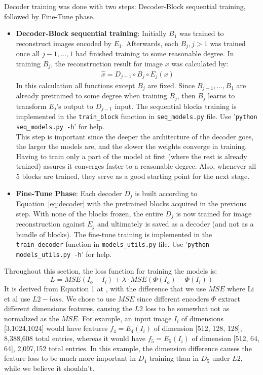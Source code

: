 Decoder training was done with two steps: Decoder-Block sequential training, followed by Fine-Tune phase.
\begin{itemize}
	\item \textbf{Decoder-Block sequential training}: Initially $B_1$ was trained to reconstruct images encoded by $E_1$. Afterwards, each $B_j, j>1$ was trained once all $j-1,\dots,1$ had finished training to some reasonable degree. In training $B_j$, the reconstruction result for image $x$ was calculated by:
	\begin{gather*}
	\hat{x} = D_{j-1} \circ B_j \circ E_j (x)
	\end{gather*}
	In this calculation all functions except $B_j$ are fixed. Since $B_{j-1}, \dots, B_1$ are already pretrained to some degree when training $B_j$, then $B_j$ learns to transform $E_j$'s output to $D_{j-1}$ input. The sequential blocks training is implemented in the \texttt{train\_block} function in \texttt{seq\_models.py} file. Use '\texttt{python seq\_models.py -h}' for help.\\
	This step is important since the deeper the architecture of the decoder goes, the larger the models are, and the slower the weights converge in training. Having to train only a part of the model at first (where the rest is already trained) assures it converges faster to a reasonable degree. Also, whenever all 5 blocks are trained, they serve as a good starting point for the next stage.
	

	\item \textbf{Fine-Tune Phase}: Each decoder $D_j$ is built according to Equation~\ref*{eq:decoder} with the pretrained blocks acquired in the previous step. With none of the blocks frozen, the entire $D_j$ is now trained for image reconstruction against $E_j$ and ultimately is saved as a decoder (and not as a bundle of blocks). The fine-tune training is implemented in the \texttt{train\_decoder} function in \texttt{models\_utils.py} file. Use '\texttt{python models\_utils.py -h}' for help.
\end{itemize}

Throughout this section, the loss function for training the models is:
\begin{equation}\label{eq:loss}
L = MSE(I_o-I_i) + \lambda \cdot MSE(\Phi(I_o)-\Phi(I_i))
\end{equation}
It is derived from Equation 1 at \cite{bib11}, with the difference that we use $MSE$ where Li et al use $L2 -loss$. We chose to use $MSE$ since different encoders $\Phi$ extract different dimensions features, causing the $L2$ loss to be somewhat not as normalized as the $MSE$. For example, an input image $I_i$ of dimensions [3,1024,1024] would have features $f_4=E_4(I_i)$ of dimension [512, 128, 128], 8,388,608 total entries, whereas it would have $f_5=E_5(I_i)$ of dimension [512, 64, 64], 2,097,152 total entries. In this example, the dimension difference causes the feature loss to be much more important in $D_4$ training than in $D_5$ under $L2$, while we believe it shouldn't.

